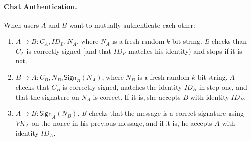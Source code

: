 \documentclass[11pt]{article}
\begin{document}
\paragraph{Chat Authentication.} When users $A$ and $B$ want to
mutually authenticate each other:
\begin{enumerate}
\item $A \longrightarrow B: C_A, ID_B, N_A$, where $N_A$ is a fresh
  random $k$-bit string.  $B$ checks than $C_A$ is correctly signed
  (and that $ID_B$ matches his identity) and stops if it is not.
\item $B \longrightarrow A: C_B, N_B, \mathsf{Sign}_B(N_A)$, where
  $N_B$ is a fresh random $k$-bit string.  $A$ checks that $C_B$ is
  correctly signed, matches the identity $ID_B$ in step one, and that
  the signature on $N_A$ is correct.  If it is, she accepts $B$ with
  identity $ID_B$.
\item $A \longrightarrow B: \mathsf{Sign}_A(N_B)$.  $B$ checks that
  the message is a correct signature using $VK_A$ on the nonce in his
  previous message, and if it is, he accepts $A$ with identity $ID_A$.
\end{enumerate}
\end{document}
